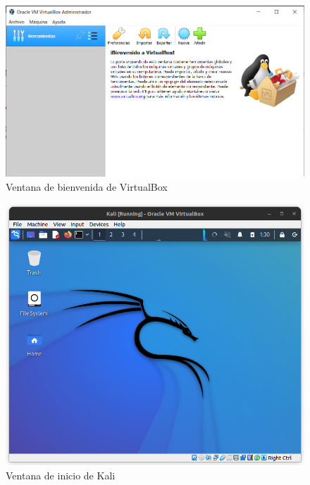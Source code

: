 \documentclass{article}
\begin{document}
        \begin{figure}[!htbp]
            \centering
            \includegraphics[scale=0.25]{img/virtual-box.png}
            \caption{Ventana de bienvenida de VirtualBox}
            \label{fig:fresh-vbox}
        \end{figure}

        \begin{figure}[!htbp]
            \centering
            \includegraphics[scale=0.25]{img/kali-screen.png}
            \caption{Ventana de inicio de Kali}
            \label{fig:kali-init}
        \end{figure}
\end{document}
